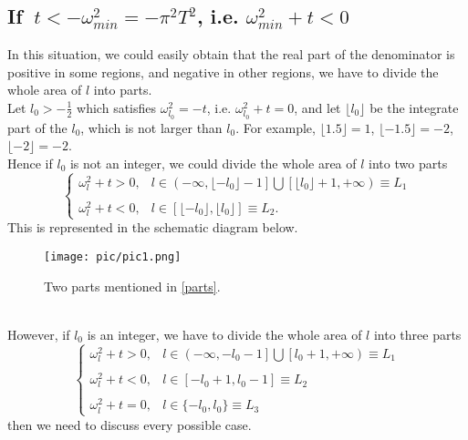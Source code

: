 \documentclass{article}
\begin{document}
\subsection{If \texorpdfstring{$\ t<-\omega_{min}^2=-\pi^2T^2$}{}, i.e. \texorpdfstring{$\omega_{min}^2+t<0$}{}} 
In this situation, we could easily obtain that the real part of the denominator is positive in some regions, and negative in other regions, we have to divide the whole area of $l$ into parts.\\
Let $l_0>-\frac{1}{2}$ which satisfies $\omega_{l_0}^2=-t$, i.e. $\omega_{l_0}^2+t=0$, and let $\lfloor l_0 \rfloor $ be the integrate part of the $l_0$, which is not larger than $l_0$. For example, $\lfloor1.5\rfloor=1$, $\lfloor-1.5\rfloor=-2$, $\lfloor-2\rfloor=-2$.\\
Hence if $l_0$ is not an integer, we could divide the whole area of $l$ into two parts
\begin{equation}\label{parts}
    \begin{cases}
        \omega_l^2+t>0,&l\in\left(-\infty,\lfloor-l_0\rfloor -1\right] \bigcup\left[\lfloor l_0\rfloor +1,+\infty\right)\equiv L_1   \\ \\
        \omega_l^2+t<0,&l\in\left[\lfloor-l_0\rfloor,\lfloor l_0\rfloor\right]\equiv L_2.
    \end{cases}       
\end{equation}
This is represented in the schematic diagram below.
\begin{figure}[!htb]
\centering
\texttt{[image: pic/pic1.png]}
\caption{\label{fig:1}Two parts mentioned in \autoref{parts}.}
\end{figure}
\\However, if $l_0$ is an integer, we have to divide the whole area of $l$ into three parts
\begin{equation}
    \begin{cases}\label{three_cases}  
        \omega_l^2+t>0,&l\in\left( -\infty,-l_0-1 \right] \bigcup\left[ l_0+1,+\infty \right) \equiv L_1  \\ \\
        \omega_l^2+t<0,&l\in\left[ -l_0+1,l_0-1 \right] \equiv L_2 \\ \\
        \omega_l^2+t=0,&l\in\{-l_0,l_0\} \equiv L_3 
    \end{cases}       
\end{equation}
then we need to discuss every possible case.
\newpage
\end{document}
